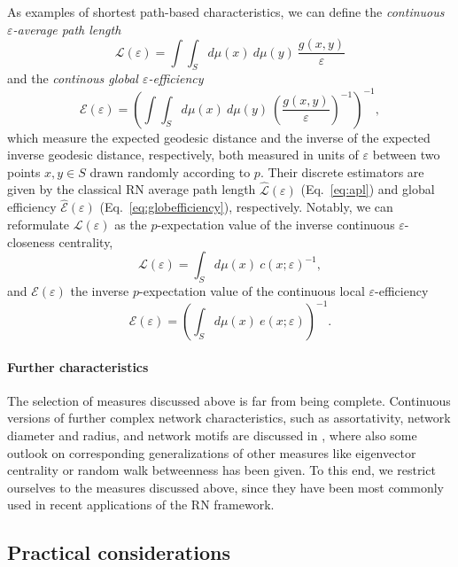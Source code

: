 As examples of shortest path-based characteristics, we can define the \emph{continuous $\varepsilon$-average path length}
\begin{equation}
\mathcal{L}(\varepsilon)=\int\int_S d\mu(x)\ d\mu(y)\ \frac{g(x,y)}{\varepsilon}
\end{equation}
\noindent
and the \emph{continous global $\varepsilon$-efficiency}
\begin{equation}
\mathcal{E}(\varepsilon)=\left(\int\int_S d\mu(x)\ d\mu(y)\ \left(\frac{g(x,y)}{\varepsilon}\right)^{-1}\right)^{-1},
\end{equation}
\noindent
which measure the expected geodesic distance and the inverse of the expected inverse geodesic distance, respectively, both measured in units of $\varepsilon$ between two points $x,y\in S$ drawn randomly according to $p$. Their discrete estimators are given by the classical RN average path length $\hat{\mathcal{L}}(\varepsilon)$ (Eq.~\ref{eq:apl}) and global efficiency $\hat{\mathcal{E}}(\varepsilon)$ (Eq.~\ref{eq:globefficiency}), respectively. Notably, we can reformulate $\mathcal{L}(\varepsilon)$ as the $p$-expectation value of the inverse continuous $\varepsilon$-closeness centrality,
\begin{equation}
\mathcal{L}(\varepsilon)=\int_S d\mu(x)\ c(x;\varepsilon)^{-1},
\end{equation}
\noindent
and $\mathcal{E}(\varepsilon)$ the inverse $p$-expectation value of the continuous local $\varepsilon$-efficiency
\begin{equation}
\mathcal{E}(\varepsilon)=\left(\int_S d\mu(x)\ e(x;\varepsilon)\right)^{-1}.
\end{equation}


\paragraph{Further characteristics}

The selection of measures discussed above is far from being complete. Continuous versions of further complex network characteristics, such as assortativity, network diameter and radius, and network motifs are discussed in \cite{Donges2012PRE}, where also some outlook on corresponding generalizations of other measures like eigenvector centrality or random walk betweenness has been given. To this end, we restrict ourselves to the measures discussed above, since they have been most commonly used in recent applications of the RN framework.


	\subsection{Practical considerations}
